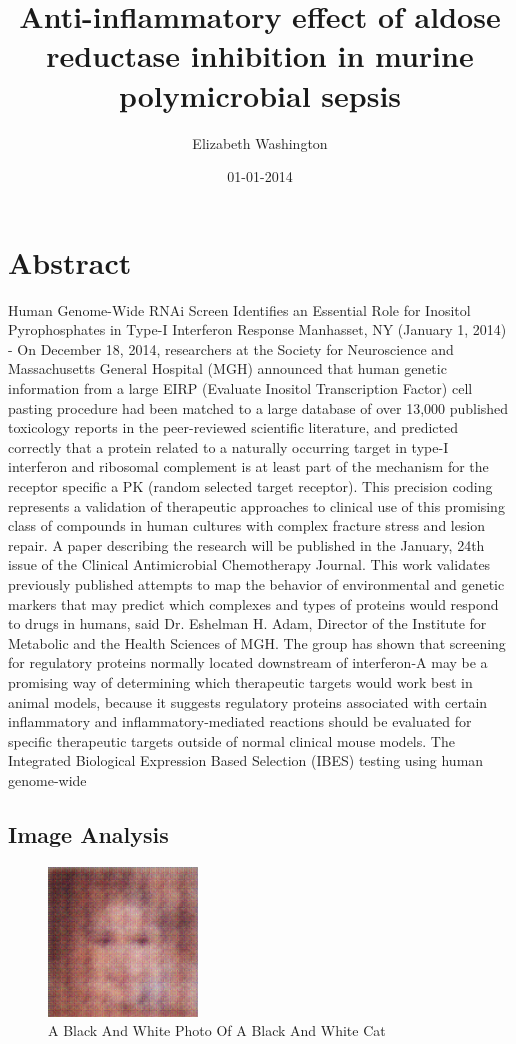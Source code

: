 \documentclass{article}%
\title{Anti{-}inflammatory effect of aldose reductase inhibition in murine polymicrobial sepsis}%
\author{Elizabeth Washington}%
\affil{Department of Biochemistry, Osmania University, Hyderabad, A.P., India}%
\date{01{-}01{-}2014}%
\begin{document}
%
\normalsize%
\maketitle%
\section{Abstract}%
\label{sec:Abstract}%
Human Genome{-}Wide RNAi Screen Identifies an Essential Role for Inositol Pyrophosphates in Type{-}I Interferon Response\newline%
Manhasset, NY (January 1, 2014) {-} On December 18, 2014, researchers at the Society for Neuroscience and Massachusetts General Hospital (MGH) announced that human genetic information from a large EIRP (Evaluate Inositol Transcription Factor) cell pasting procedure had been matched to a large database of over 13,000 published toxicology reports in the peer{-}reviewed scientific literature, and predicted correctly that a protein related to a naturally occurring target in type{-}I interferon and ribosomal complement is at least part of the mechanism for the receptor specific a PK (random selected target receptor). This precision coding represents a validation of therapeutic approaches to clinical use of this promising class of compounds in human cultures with complex fracture stress and lesion repair.\newline%
A paper describing the research will be published in the January, 24th issue of the Clinical Antimicrobial Chemotherapy Journal.\newline%
This work validates previously published attempts to map the behavior of environmental and genetic markers that may predict which complexes and types of proteins would respond to drugs in humans, said Dr. Eshelman H. Adam, Director of the Institute for Metabolic and the Health Sciences of MGH. The group has shown that screening for regulatory proteins normally located downstream of interferon{-}A may be a promising way of determining which therapeutic targets would work best in animal models, because it suggests regulatory proteins associated with certain inflammatory and inflammatory{-}mediated reactions should be evaluated for specific therapeutic targets outside of normal clinical mouse models.\newline%
The Integrated Biological Expression Based Selection (IBES) testing using human genome{-}wide

%
\subsection{Image Analysis}%
\label{subsec:ImageAnalysis}%


\begin{figure}[h!]%
\centering%
\includegraphics[width=150px]{500_fake_images/samples_5_74.png}%
\caption{A Black And White Photo Of A Black And White Cat}%
\end{figure}

%
\end{document}
